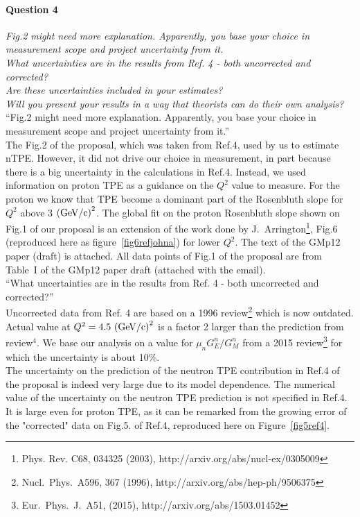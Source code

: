 \documentclass[11pt]{article}
\begin{document}
\paragraph{Question 4}
{\it Fig.2 might need more explanation. Apparently, you base your choice in
measurement scope and project uncertainty from it.}\\
{\it What uncertainties are in the results from Ref. 4 - both uncorrected and corrected?}\\
{\it Are these uncertainties included in your estimates?}\\
{\it Will you present your results in a way that theorists can do their own analysis?}\\

``Fig.2 might need more explanation. Apparently, you base your choice in measurement scope and project uncertainty from it.''\\
The Fig.2 of the proposal, which was taken from Ref.4, used by us to estimate nTPE. However, it did not drive our choice in measurement, in part because there is a big uncertainty in
the calculations in Ref.4. Instead, we used information on proton TPE as a guidance on the $Q^2$ value to measure. For the proton we know that TPE become a dominant part of the Rosenbluth slope for $Q^2$ above 3 ${\rm(GeV/c)}^2$. 
The global fit on the proton Rosenbluth slope shown on Fig.1 of our proposal is an extension of the work done by J.~Arrington\footnote{Phys. Rev. C68, 034325 (2003), http://arxiv.org/abs/nucl-ex/0305009}, %
Fig.6 (reproduced here as figure~\ref{fig6refjohna})
for lower $Q^2$.
The text of the GMp12 paper (draft) is attached.
All data points of Fig.1 of the proposal are from Table~I of the GMp12 paper draft (attached with the email).\\

``What uncertainties are in the results from Ref. 4 - both uncorrected and corrected?''\\
Uncorrected data from Ref. 4 are based on a 1996 review\footnote{Nucl.~Phys.~A596, 367 (1996), http://arxiv.org/abs/hep-ph/9506375} %
which is now outdated. Actual value at $Q^2 =4.5~{\rm (GeV/c)}^2$ is a factor 2 larger than the prediction from review$^4$.
We base our analysis on a value for $\mu_n G_E^n/G_M^n$ from a 2015 review\footnote{Eur.~Phys.~J.~A51, (2015), http://arxiv.org/abs/1503.01452} %
for which the uncertainty is about 10\%.\\
The uncertainty on the prediction of the neutron TPE contribution in Ref.4 of the proposal is indeed very large due to its model dependence. The numerical value of the uncertainty on the neutron TPE prediction is not specified in Ref.4.\\
It is large even for proton TPE, as it can be remarked from the growing error of the "corrected" data on Fig.5. of Ref.4, reproduced here on Figure~\ref{fig5ref4}.
\end{document}
